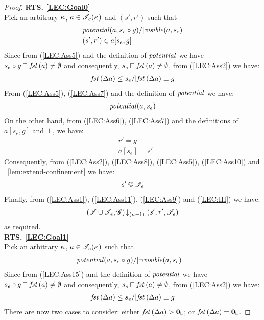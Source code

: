 \begin{lemma}
\begin{proof}
\noindent\textbf{RTS. \ref{LEC:Goal0}}\\
Pick an arbitrary $\kappa_{}$, $a \in \mathscr{I}_e(\kappa_{})$ and $(s', r')$ such that
%
\begin{align}
	& \mathit{potential}(a, s_e \circ g) /| \mathit{visible}(a, s_e) \label{LEC:Ass5}\\
	& (s', r') \in a[s_e, g] \label{LEC:Ass6}
\end{align}
Since from (\ref{LEC:Ass5}) and the definition of $\mathit{potential}$ we have $s_e \circ g \sqcap_{} \mathit{fst}\left(a\right) \not= \emptyset$ and consequently, $s_e \sqcap_{} \mathit{fst}\left(a\right) \not= \emptyset$, from (\ref{LEC:Ass2}) we have:
%
\begin{align}
	\mathit{fst}\left(\Delta {a}\right) \leq s_e /| \mathit{fst}\left(\Delta {a}\right) \mathrel{\bot} g\label{LEC:Ass7}
\end{align}
% 
From (\ref{LEC:Ass5}), (\ref{LEC:Ass7}) and the definition of $\mathit{potential}$ we have:
%
\begin{align}
	\mathit{potential}(a, s_e) \label{LEC:Ass8}
\end{align}
%
On the other hand, from (\ref{LEC:Ass6}), (\ref{LEC:Ass7}) and the definitions of $a[s_e, g]$ and $\mathrel{\bot}$, we have: 
%
\begin{align}
	& r' = g \label{LEC:Ass9}\\
	& a[s_e] = s' \label{LEC:Ass10}
\end{align}
%
Consequently, from (\ref{LEC:Ass2}), (\ref{LEC:Ass8}), (\ref{LEC:Ass5}), (\ref{LEC:Ass10}) and \lem~\ref{lem:extend-confinement} we have:
%
\begin{align}
	s' \confines \lmod_e  \label{LEC:Ass11}
\end{align}
%
Finally, from (\ref{LEC:Ass1}), (\ref{LEC:Ass11}), (\ref{LEC:Ass9}) and (\ref{LEC:IH}) we have:
%
\begin{align*}
	\left(\mathscr{I} \cup \mathscr{I}_{e}, \mathscr{G}\right) \!\downarrow_{(n-1)} \left(s', r', \mathscr{I}_e\right)
\end{align*}
%
as required.\\
%
%
%

\noindent\textbf{RTS. \ref{LEC:Goal1}}\\
Pick an arbitrary $\kappa_{}$, $a \in \mathscr{I}_e(\kappa_{})$ such that
%
\begin{align}
	& \mathit{potential}(a, s_e \circ g) /| \neg\mathit{visible}(a, s_e) \label{LEC:Ass15}
\end{align}
Since from (\ref{LEC:Ass15}) and the definition of $\mathit{potential}$ we have $s_e \circ g \sqcap_{} \mathit{fst}\left(a\right) \not= \emptyset$ and consequently, $s_e \sqcap_{} \mathit{fst}\left(a\right) \not= \emptyset$, from (\ref{LEC:Ass2}) we have:
%
\begin{align}
	\mathit{fst}\left(\Delta {a}\right) \leq s_e /| \mathit{fst}\left(\Delta {a}\right) \mathrel{\bot} g \label{LEC:Ass16}
\end{align}
% 
There are now two cases to consider: either $\mathit{fst}\left(\Delta {a}\right) > \mathbf{0}_{\textsf{L}}$; or $\mathit{fst}\left(\Delta {a}\right) = \mathbf{0}_{\textsf{L}}$.


\end{proof}
\end{lemma}

